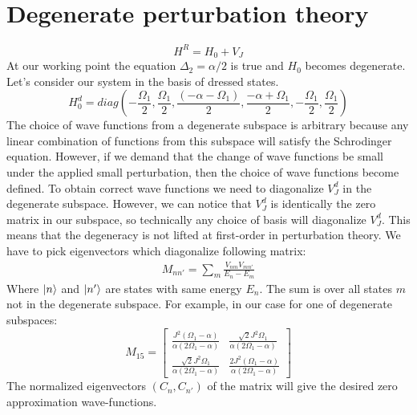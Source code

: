 \documentclass[%
 aip,
 amsmath,amssymb,
 reprint,%
]{revtex4-1}
\begin{document}
\section{Degenerate perturbation theory} \label{sec:dpt}
\begin{equation}
H^R=H_0+V_J
\end{equation}
At our working point the equation $\Delta_2=\alpha/2$ is true and $H_0$ becomes degenerate. Let's consider our system in the basis of dressed states.
\begin{equation}
H_0^{d}= diag(-\frac{\Omega_{1}}{2},\frac{\Omega_{1}}{2},\frac{(-\alpha-\Omega_{1})}{2},\frac{-\alpha+\Omega_{1}}{2},-\frac{\Omega_{1}}{2},\frac{\Omega_{1}}{2})
\end{equation}
The choice of wave functions from a degenerate subspace is arbitrary because any linear combination of functions from this subspace will satisfy the Schrodinger equation. However, if we demand that the change of wave functions be small under the applied small perturbation, then the choice of wave functions become defined. To obtain correct wave functions we need to diagonalize $V_J^{d}$ in the degenerate subspace. However, we can notice that $V_J^{d}$ is identically the zero matrix in our subspace, so technically any choice of basis will diagonalize $V_J^{d}$. This means that the degeneracy is not lifted at first-order in perturbation theory. We have to pick eigenvectors which diagonalize following matrix:
\begin{equation}
	\begin{matrix}
	M_{nn'} = \sum_{m}\frac{V_{nm}V_{mn'}}{E_n-E_m}
	\end{matrix}
\end{equation}
Where $\ket{n}$ and $\ket{n'}$ are states with same energy $E_n$.  The sum is over all states $m$ not in the degenerate subspace.
For example, in our case for one of degenerate subspaces:
\begin{equation}
	M_{15} =\left[\begin{matrix}\frac{J^{2} \left(\Omega_{1} - \alpha\right)}{\alpha \left(2 \Omega_{1} - \alpha\right)} & \frac{\sqrt{2} J^{2} \Omega_{1}}{\alpha \left(2 \Omega_{1} - \alpha\right)}\\\frac{\sqrt{2} J^{2} \Omega_{1}}{\alpha \left(2 \Omega_{1} - \alpha\right)} & \frac{2 J^{2} \left(\Omega_{1} - \alpha\right)}{\alpha \left(2 \Omega_{1} - \alpha\right)}\end{matrix}\right]
\end{equation}
The normalized eigenvectors $(C_n,C_{n'})$ of the matrix will give the desired zero approximation wave-functions.
\end{document}
